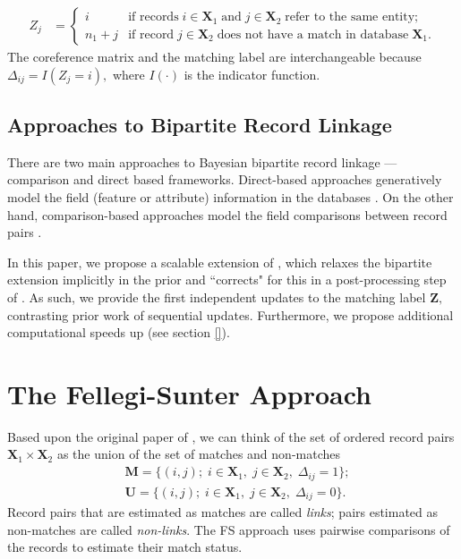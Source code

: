 \documentclass[ba]{imsart}
\newcommand{\bM}{\boldsymbol{M}}
\newcommand{\bU}{\boldsymbol{U}}
\newcommand{\bZ}{\boldsymbol{Z}}
\newcommand{\bX}{\boldsymbol{X}}
\begin{document}
\begin{align}
Z_j &=
\begin{cases}
i  & \text{if records} \; i \in \bX_1 \; \text{and}\; j \in \bX_2 \; \text{refer to the same entity;} \\
n_1 + j &  \text{if record} \; j \in \bX_2 \; \text{does not have a match in database} \; \bX_1. 
\end{cases}
\end{align}
The coreference matrix and the matching label are interchangeable because $\Delta_{ij} = I(Z_j = i),$ where $I(\cdot)$ is the indicator function. 

\subsection{Approaches to Bipartite Record Linkage}
\label{sec:approaches}

There are two main approaches to Bayesian bipartite record linkage --- comparison and direct based frameworks. Direct-based approaches generatively model the field (feature or attribute) information in the databases \citep{gutman_bayesian_2013, steorts_smered_2014, steorts_entity_2015, zanella_flexible_2016, steorts_performance_2017, kaplan_posterior_2018}. On the other hand, comparison-based approaches model the field comparisons between record pairs \citep{sadinle_detecting_2014, sadinle_bayesian_2017, mcveigh2019scaling}. 

In this paper, we propose a scalable extension of \cite{sadinle_bayesian_2017}, which relaxes the bipartite extension implicitly in the prior and ``corrects" for this in a post-processing step of \cite{jaro_1989}. As such, we provide the first independent updates to the matching label $\bZ,$ contrasting prior work of sequential updates. Furthermore, we propose additional computational speeds up (see section \ref{}). 

\section{The Fellegi-Sunter Approach}
\label{sec:fellegi}

Based upon the original paper of \cite{fellegi_theory_1969}, we can think of the set of ordered record pairs $\bX_1 \times \bX_2$ as the union of the set of matches and non-matches
\begin{align}
&\bM = \{
(i,j); \;  i \in \bX_1, \; j \in \bX_2,\;  \Delta_{ij} = 1
\};\\
&\bU = \{
(i,j); \;  i \in \bX_1, \; j \in \bX_2,\;  \Delta_{ij} = 0
\}.
\end{align}
Record pairs that are estimated as matches are called \textit{links}; pairs estimated as non-matches are called \textit{non-links}. The FS approach uses pairwise comparisons of the records to estimate their match status. 
\end{document}
